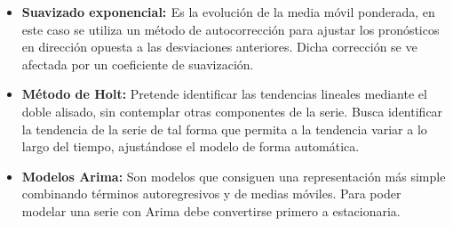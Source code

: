 \begin{itemize}
\tightlist
    \item\textbf{Suavizado exponencial: \cite{suavizado_exponencial}} Es la evolución de la media móvil ponderada, en este caso se utiliza un método de autocorrección para ajustar los pronósticos en dirección opuesta a las desviaciones anteriores. Dicha corrección se ve afectada por un coeficiente de suavización.
    \item\textbf{Método de Holt:} Pretende identificar las tendencias lineales mediante el doble alisado, sin contemplar otras componentes de la serie. Busca identificar la tendencia de la serie de tal forma que permita a la tendencia variar a lo largo del tiempo, ajustándose el modelo de forma automática.
    \item\textbf{Modelos Arima:} Son modelos que consiguen una representación más simple combinando términos autoregresivos y de medias móviles.
    Para poder modelar una serie con Arima debe convertirse primero a estacionaria.
\end{itemize}
